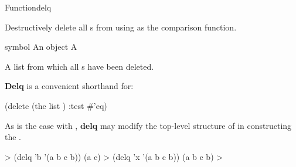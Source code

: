 \documentclass[10pt,twoside,english,pdftex]{article}
\begin{document}

\begin{functiondoc}{Function}{delq}{
    \returns{} } 
%
  
\fnsyntax

\fnpurpose Destructively delete all s from  using
 as the comparison function.

\fnpackage {}

\fnmodule {}

\fnargs
\begin{args}{symbol}
\arg[item] An object
\arg[list] A 
\end{args}

\fnreturns A list from which all s have been deleted.

\fndescription \textbf{Delq} is a convenient shorthand for:
%
\W\supp
\begin{example}
  (delete  (the list ) :test #'eq)
\end{example}
As is the case with , \textbf{delq} may modify the top-level
structure of  in constructing the .

\fnexamples
\W\supp
\begin{example}
  > (delq 'b '(a b c b))
  (a c)
  > (delq 'x '(a b c b))
  (a b c b)
  >
\end{example}

\end{functiondoc}

\end{document}
